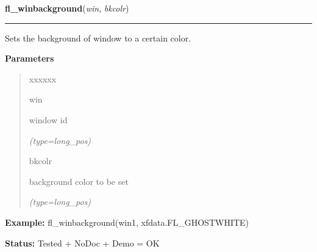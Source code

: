    \vspace{0.5ex}

\hspace{.8\funcindent}\begin{boxedminipage}{\funcwidth}

    \raggedright \textbf{fl\_winbackground}(\textit{win}, \textit{bkcolr})

    \vspace{-1.5ex}

    \rule{\textwidth}{0.5\fboxrule}
\setlength{\parskip}{2ex}
    Sets the background of window to a certain color.

\setlength{\parskip}{1ex}
      \textbf{Parameters}
      \vspace{-1ex}

      \begin{quote}
        \begin{Ventry}{xxxxxx}

          \item[win]

          window id

            {\it (type=long\_pos)}

          \item[bkcolr]

          background color to be set

            {\it (type=long\_pos)}

        \end{Ventry}

      \end{quote}

\textbf{Example:} fl\_winbackground(win1, xfdata.FL\_GHOSTWHITE)



\textbf{Status:} Tested + NoDoc + Demo = OK



    \end{boxedminipage}

    \label{xformslib:flxbasic:fl_winbackground}

    \vspace{0.5ex}

